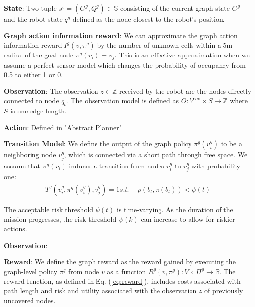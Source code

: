\documentclass{article}
\newcommand{\ph}[1]{{\textbf{#1}:}} %
\begin{document}
\ph{State} Two-tuple $s^g=(G^g, Q^g) \in \mathbb{S}$ consisting of the current graph state $G^g$ and the robot state $q^g$ defined as the node closest to the robot's position. 

\ph{Graph action information reward}
We can approximate the graph action information reward $I^g(v, \pi^g)$ by the number of unknown cells within a 5m radius of the goal node $\pi^g(v_i)=v_j$.  This is an effective approximation when we assume a perfect sensor model which changes the probability of occupancy from 0.5 to either 1 or 0.  

\ph{Observation} The observation $z \in \mathbb{Z}$ received by the robot are the nodes directly connected to node $q_t$. The observation model is defined as $O: V^{cov} \times S \rightarrow \mathbb{Z}$ where $S$ is one edge length.

\ph{Action} Defined in "Abstract Planner"

\ph{Transition Model} We define the output of the graph policy $\pi^g(v_i^g)$ to be a neighboring node $v_j^g$, which is connected via a short path through free space. We assume that $\pi^{g}(v_i)$ induces a transition from nodes $v_i^g$ to $v_j^g$ with probability one:
\begin{align}
    T^{g} (v_i^g, \pi^g(v_i^g), v_j^g) = 1
    s.t.~&~\rho(b_t,\pi(b_t)) < \psi(t)
\end{align}

The acceptable risk threshold $\psi(t)$ is time-varying. As the duration of the mission progresses, the risk threshold $\psi(k)$ can increase to allow for riskier actions.

\ph{Observation}

\ph{Reward} We define the graph reward as the reward gained by executing the graph-level policy $\pi^g$ from node $v$ as a function $R^g(v, \pi^g): V \times \Pi^g \to \mathbb{R}$. The reward function, as defined in Eq. (\ref{eq:reward}), includes costs associated with path length and risk and utility associated with the observation $z$ of previously uncovered nodes. 

\end{document}
